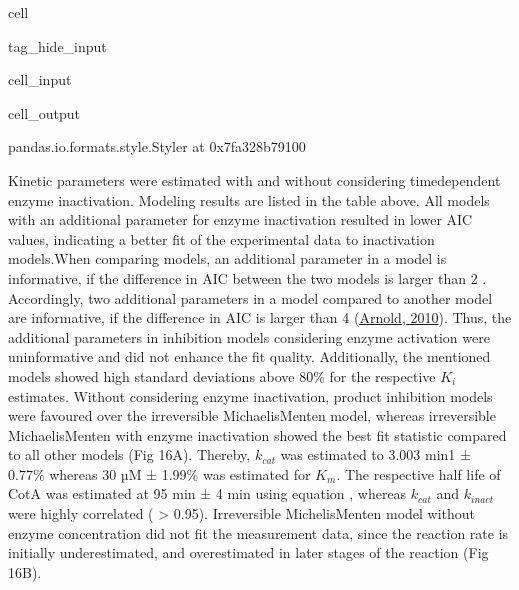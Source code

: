 \documentclass[letterpaper,12pt,english]{jupyterBook}
\begin{document}
\begin{sphinxuseclass}{cell}
\begin{sphinxuseclass}{tag_hide_input}
\begin{sphinxVerbatimInput}
\begin{sphinxuseclass}{cell_input}
\end{sphinxuseclass}\end{sphinxVerbatimInput}
\begin{sphinxVerbatimOutput}

\begin{sphinxuseclass}{cell_output}
\begin{sphinxVerbatim}[commandchars=\\\{\}]
\PYGZlt{}pandas.io.formats.style.Styler at 0x7fa328b79100\PYGZgt{}
\end{sphinxVerbatim}

\end{sphinxuseclass}\end{sphinxVerbatimOutput}

\end{sphinxuseclass}
\end{sphinxuseclass}
\sphinxAtStartPar
Kinetic parameters were estimated with and without considering time\sphinxhyphen{}dependent enzyme inactivation.
Modeling results are listed in the table above.
All models with an additional parameter for enzyme inactivation resulted in lower AIC values, indicating a better fit of the experimental data to inactivation models.When comparing models, an additional parameter in a model is informative, if the difference in AIC between the two models is larger than 2 . Accordingly, two additional parameters in a model compared to another model are informative, if the difference in AIC is larger than 4 (\hyperlink{cite.references:id16}{Arnold, 2010}). Thus, the additional parameters in inhibition models considering enzyme activation were uninformative and did not enhance the fit quality. Additionally, the mentioned models showed high standard deviations above 80\% for the respective \(K_{i}\) estimates.
Without considering enzyme inactivation, product inhibition models were favoured over the irreversible Michaelis\sphinxhyphen{}Menten model,
whereas irreversible Michaelis\sphinxhyphen{}Menten with enzyme inactivation showed the best fit statistic compared to all other models (Fig 16A). Thereby, \(k_{cat}\) was estimated to 3.003 min\sphinxhyphen{}1 ± 0.77\% whereas 30 µM ± 1.99\%  was estimated for \(K_{m}\). The respective half life of CotA was estimated at 95 min ± 4 min using equation {\hyperref[\detokenize{scenarios/SLAC_kinetic_characterization:equation-enzyme-halflife}]{}}, whereas \(k_{cat}\) and \(k_{inact}\) were highly correlated ( > 0.95). Irreversible Michelis\sphinxhyphen{}Menten model without enzyme concentration did not fit the measurement data, since the reaction rate is initially underestimated, and overestimated in later stages of the reaction (Fig 16B).
\end{document}
